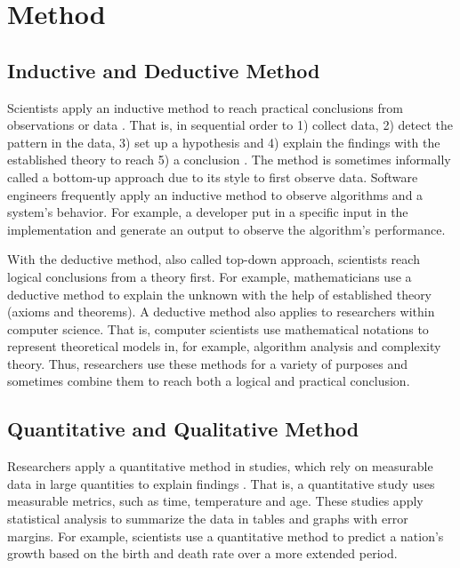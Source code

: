 \documentclass[a4paper,11pt]{kth-mag}
\newcommand*{\skippara}{\par\vspace{\baselineskip} \noindent}
\begin{document}

%
\chapter{Method}\label{chapter:method}

\section{Inductive and Deductive Method}
Scientists apply an inductive method to reach practical conclusions from observations or data \cite{Omexperi69:online}.
That is, in sequential order to 1) collect data, 2) detect the pattern in the data, 3) set up a hypothesis and 4) explain the findings with the established theory to reach 5) a conclusion \cite{web:induction}.
The method is sometimes informally called a bottom-up approach due to its style to first observe data.
Software engineers frequently apply an inductive method to observe algorithms and a system's behavior.
For example, a developer put in a specific input in the implementation and generate an output to observe the algorithm's performance.

\skippara With the deductive method, also called top-down approach, scientists reach logical conclusions from a theory first.
For example, mathematicians use a deductive method to explain the unknown with the help of established theory (axioms and theorems).
A deductive method also applies to researchers within computer science.
That is, computer scientists use mathematical notations to represent theoretical models in, for example, algorithm analysis and complexity theory.
Thus, researchers use these methods for a variety of purposes and sometimes combine them to reach both a logical and practical conclusion.

\section{Quantitative and Qualitative Method}
Researchers apply a quantitative method in studies, which rely on measurable data in large quantities to explain findings \cite{haakansson2013portal}.
That is, a quantitative study uses measurable metrics, such as time, temperature and age.
These studies apply statistical analysis to summarize the data in tables and graphs with error margins.
For example, scientists use a quantitative method to predict a nation's growth based on the birth and death rate over a more extended period.
\end{document}
